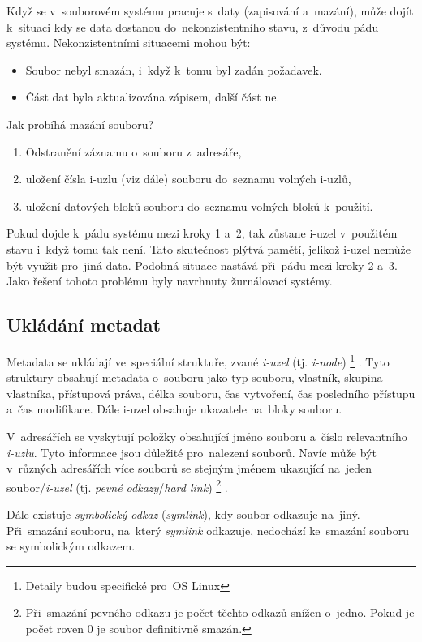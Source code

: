 Když se v~souborovém systému pracuje s~daty (zapisování a~mazání), může dojít k~situaci kdy se data dostanou do~nekonzistentního stavu, z~důvodu pádu systému. Nekonzistentními situacemi mohou být:

\begin{itemize}
	\item Soubor nebyl smazán, i~když k~tomu byl zadán požadavek.
	\item Část dat byla aktualizována zápisem, další část ne.
\end{itemize}

Jak probíhá mazání souboru?

\begin{enumerate}
	\item Odstranění záznamu o~souboru z~adresáře,
	\item uložení čísla i-uzlu (viz dále) souboru do~seznamu volných i-uzlů,
	\item uložení datových bloků souboru do~seznamu volných bloků k~použití.
\end{enumerate}

Pokud dojde k~pádu systému mezi kroky 1 a~2, tak zůstane i-uzel v~použitém stavu i~když tomu tak není. Tato skutečnost plýtvá pamětí, jelikož i-uzel nemůže být využit pro~jiná data. Podobná situace nastává při~pádu mezi kroky 2 a~3. Jako řešení tohoto problému byly navrhnuty žurnálovací systémy.

\subsection{Ukládání metadat}

Metadata se ukládají ve~speciální struktuře, zvané \emph{i-uzel} (tj. \emph{i-node})%
\footnote{Detaily budou specifické pro~OS Linux}%
. Tyto struktury obsahují metadata o~souboru jako typ souboru, vlastník, skupina vlastníka, přístupová práva, délka souboru, čas vytvoření, čas posledního přístupu a~čas modifikace. Dále i-uzel obsahuje ukazatele na~bloky souboru.

V~adresářích se vyskytují položky obsahující jméno souboru a~číslo relevantního \emph{i-uzlu}. Tyto informace jsou důležité pro~nalezení souborů. Navíc může být v~různých adresářích více souborů se stejným jménem ukazující na~jeden soubor/\emph{i-uzel} (tj. \emph{pevné odkazy}/\emph{hard link})%
\footnote{Při~smazání pevného odkazu je počet těchto odkazů snížen o~jedno. Pokud je počet roven 0 je soubor definitivně smazán.}%
.

Dále existuje \emph{symbolický odkaz} (\emph{symlink}), kdy soubor odkazuje na~jiný. Při~smazání souboru, na~který \emph{symlink} odkazuje, nedochází ke~smazání souboru se symbolickým odkazem.

